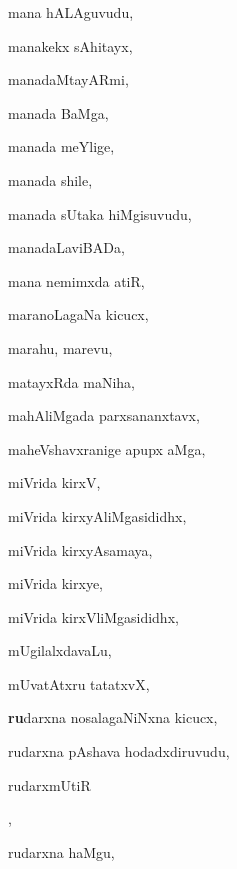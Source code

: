 \begin{multicols}{3}
{\noindent
{mana hALAguvudu}, \pageref{mana hALAguvudu}

\noindent
{manakekx sAhitayx}, \pageref{manakekx sAhitayx}

\noindent
{manadaMtayARmi}, \pageref{manadaMtayARmi}

\noindent
{manada BaMga}, \pageref{manada BaMga}

\noindent
{manada meYlige}, \pageref{manada meYlige}

\noindent
{manada shile}, \pageref{manada shile}

\noindent
{manada sUtaka hiMgisuvudu}, \pageref{manada sUtaka hiMgisuvudu}

\noindent
{manadaLaviBADa}, \pageref{manadaLaviBADa}

\noindent
{mana nemimxda atiR}, \pageref{mana nemimxda atiR}

\noindent
{maranoLagaNa kicucx}, \pageref{maranoLagaNa kicucx}

\noindent
{marahu, marevu}, \pageref{marahu, marevu}

\noindent
{matayxRda maNiha}, \pageref{matayxRda maNiha}

\noindent
{mahAliMgada parxsananxtavx}, \pageref{mahAliMgada parxsananxtavx}

\noindent
{maheVshavxranige apupx aMga}, \pageref{maheVshavxranige apupx aMga}

\noindent
{miVrida kirxV}, \pageref{miVrida kirxV}

\noindent
{miVrida kirxyAliMgasididhx}, \pageref{miVrida kirxyAliMgasididhx}

\noindent
{miVrida kirxyAsamaya}, \pageref{miVrida kirxyAsamaya}

\noindent
{miVrida kirxye}, \pageref{miVrida kirxye}

\noindent
{miVrida kirxVliMgasididhx}, \pageref{miVrida kirxVliMgasididhx}

\noindent
{mUgilalxdavaLu}, \pageref{mUgilalxdavaLu}

\noindent
{mUvatAtxru tatatxvX}, \pageref{mUvatAtxru tatatxvX}

\noindent
{{\large\textbf{ru}}darxna nosalagaNiNxna kicucx}, \pageref{rudarxna nosalagaNiNxna kicucx}

\noindent
{rudarxna pAshava hodadxdiruvudu}, \pageref{rudarxna pAshava hodadxdiruvudu}

\noindent
{rudarxmUtiR}

\noindent
{}, \pageref{rudarxmUtiR jaMgamavAguvudu}

\noindent
{rudarxna haMgu}, \pageref{rudarxna haMgu}

}
\end{multicols}
